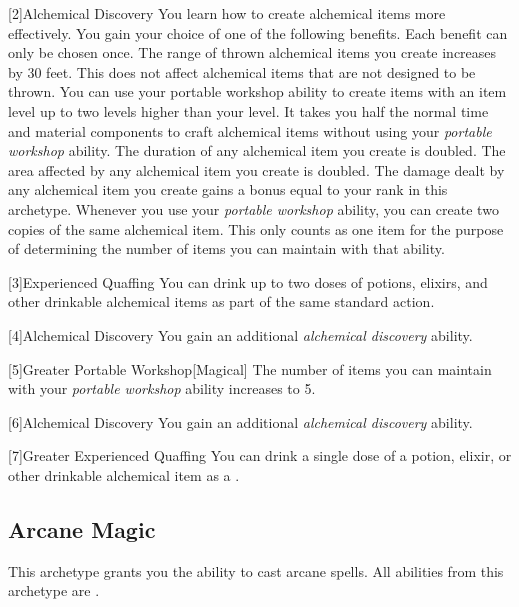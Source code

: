         [2]{Alchemical Discovery} You learn how to create alchemical items more effectively.
        You gain your choice of one of the following benefits.
        Each benefit can only be chosen once.
        {
             The range of thrown alchemical items you create increases by 30 feet.
                This does not affect alchemical items that are not designed to be thrown.
             You can use your portable workshop ability to create items with an item level up to two levels higher than your level.
             It takes you half the normal time and material components to craft alchemical items without using your \textit{portable workshop} ability.
             The duration of any alchemical item you create is doubled.
             The area affected by any alchemical item you create is doubled.
             The damage dealt by any alchemical item you create gains a bonus equal to your rank in this archetype.
             Whenever you use your \textit{portable workshop} ability, you can create two copies of the same alchemical item.
            This only counts as one item for the purpose of determining the number of items you can maintain with that ability.
        }

        [3]{Experienced Quaffing} You can drink up to two doses of potions, elixirs, and other drinkable alchemical items as part of the same standard action.

        [4]{Alchemical Discovery} You gain an additional \textit{alchemical discovery} ability.

        [5]{Greater Portable Workshop}[Magical] The number of items you can maintain with your \textit{portable workshop} ability increases to 5.

        [6]{Alchemical Discovery} You gain an additional \textit{alchemical discovery} ability.

        [7]{Greater Experienced Quaffing} You can drink a single dose of a potion, elixir, or other drinkable alchemical item as a .

    \newpage
    \subsection{Arcane Magic}
        This archetype grants you the ability to cast arcane spells.
        All abilities from this archetype are .

